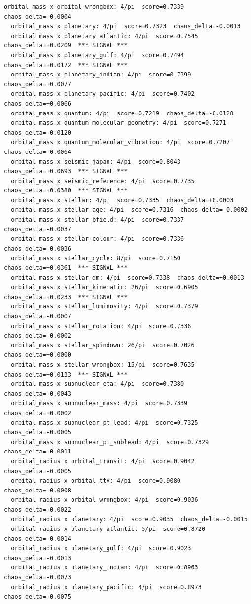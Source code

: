 \documentclass[11pt, letterpaper, openany]{book}
\begin{document}
\begin{empiricalbox}
\begin{lstlisting}[style=terminal]
  orbital_mass x orbital_wrongbox: 4/pi  score=0.7339  chaos_delta=-0.0004
  orbital_mass x planetary: 4/pi  score=0.7323  chaos_delta=-0.0013
  orbital_mass x planetary_atlantic: 4/pi  score=0.7545  chaos_delta=+0.0209  *** SIGNAL ***
  orbital_mass x planetary_gulf: 4/pi  score=0.7494  chaos_delta=+0.0172  *** SIGNAL ***
  orbital_mass x planetary_indian: 4/pi  score=0.7399  chaos_delta=+0.0077
  orbital_mass x planetary_pacific: 4/pi  score=0.7402  chaos_delta=+0.0066
  orbital_mass x quantum: 4/pi  score=0.7219  chaos_delta=-0.0128
  orbital_mass x quantum_molecular_geometry: 4/pi  score=0.7271  chaos_delta=-0.0120
  orbital_mass x quantum_molecular_vibration: 4/pi  score=0.7207  chaos_delta=-0.0064
  orbital_mass x seismic_japan: 4/pi  score=0.8043  chaos_delta=+0.0693  *** SIGNAL ***
  orbital_mass x seismic_reference: 4/pi  score=0.7735  chaos_delta=+0.0380  *** SIGNAL ***
  orbital_mass x stellar: 4/pi  score=0.7335  chaos_delta=+0.0003
  orbital_mass x stellar_age: 4/pi  score=0.7316  chaos_delta=-0.0002
  orbital_mass x stellar_bfield: 4/pi  score=0.7337  chaos_delta=-0.0037
  orbital_mass x stellar_colour: 4/pi  score=0.7336  chaos_delta=-0.0036
  orbital_mass x stellar_cycle: 8/pi  score=0.7150  chaos_delta=+0.0361  *** SIGNAL ***
  orbital_mass x stellar_dm: 4/pi  score=0.7338  chaos_delta=+0.0013
  orbital_mass x stellar_kinematic: 26/pi  score=0.6905  chaos_delta=+0.0233  *** SIGNAL ***
  orbital_mass x stellar_luminosity: 4/pi  score=0.7379  chaos_delta=-0.0007
  orbital_mass x stellar_rotation: 4/pi  score=0.7336  chaos_delta=-0.0002
  orbital_mass x stellar_spindown: 26/pi  score=0.7026  chaos_delta=+0.0000
  orbital_mass x stellar_wrongbox: 15/pi  score=0.7635  chaos_delta=+0.0133  *** SIGNAL ***
  orbital_mass x subnuclear_eta: 4/pi  score=0.7380  chaos_delta=-0.0043
  orbital_mass x subnuclear_mass: 4/pi  score=0.7339  chaos_delta=+0.0002
  orbital_mass x subnuclear_pt_lead: 4/pi  score=0.7325  chaos_delta=-0.0005
  orbital_mass x subnuclear_pt_sublead: 4/pi  score=0.7329  chaos_delta=-0.0011
  orbital_radius x orbital_transit: 4/pi  score=0.9042  chaos_delta=-0.0005
  orbital_radius x orbital_ttv: 4/pi  score=0.9080  chaos_delta=-0.0008
  orbital_radius x orbital_wrongbox: 4/pi  score=0.9036  chaos_delta=-0.0022
  orbital_radius x planetary: 4/pi  score=0.9035  chaos_delta=-0.0015
  orbital_radius x planetary_atlantic: 5/pi  score=0.8720  chaos_delta=-0.0014
  orbital_radius x planetary_gulf: 4/pi  score=0.9023  chaos_delta=-0.0013
  orbital_radius x planetary_indian: 4/pi  score=0.8963  chaos_delta=-0.0073
  orbital_radius x planetary_pacific: 4/pi  score=0.8973  chaos_delta=-0.0075

\end{lstlisting}
\end{empiricalbox}
\end{document}
